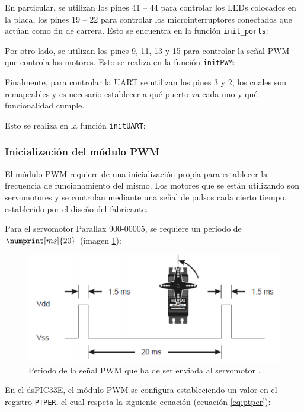 En particular, se utilizan los pines 41 -- 44 para controlar los LEDs colocados en la
placa, los pines 19 -- 22 para controlar los microinterruptores conectados que actúan
como fin de carrera. Esto se encuentra en la función \texttt{init\_ports}:



Por otro lado, se utilizan los pines 9, 11, 13 y 15 para controlar la señal \ac{PWM}
que controla los motores. Esto se realiza en la función \texttt{initPWM}:



Finalmente, para controlar la \ac{UART} se utilizan los pines 3 y 2, los cuales son
remapeables y es necesario establecer a qué puerto va cada uno y qué funcionalidad cumple.

Esto se realiza en la función \texttt{initUART}:


\subsubsection{Inicialización del módulo \ac{PWM}}
El módulo \ac{PWM} requiere de una inicialización propia para establecer la frecuencia
de funcionamiento del mismo. Los motores que se están utilizando son servomotores
y se controlan mediante una señal de pulsos cada cierto tiempo, establecido por el 
diseño del fabricante.

Para el servomotor Parallax 900-00005, se requiere un periodo de $\numprint[ms]{20}$
(imagen \ref{fig:servo_pwm}):

\begin{figure}[H]
    \centering
    \includegraphics[width=.6\linewidth]{pictures/servo_pwm.png}
    \caption{Periodo de la señal \ac{PWM} que ha de ser enviada al servomotor \cite{rs-online90000005ServomotorParallax}.}
    \label{fig:servo_pwm}
\end{figure}

En el dsPIC33E, el módulo \ac{PWM} se configura estableciendo un valor en el registro
\texttt{PTPER}, el cual respeta la siguiente ecuación (ecuación \ref{eq:ptper}):

